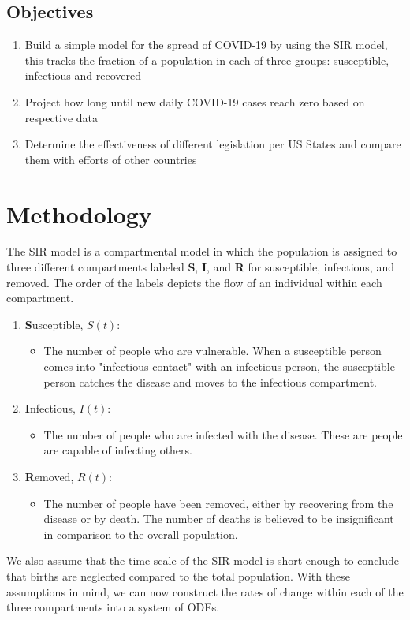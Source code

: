 \documentclass[a4paper,10pt]{article}
\begin{document}
\subsection{Objectives}

\begin{enumerate}
\item Build a simple model for the spread of COVID-19 by using the SIR model, this tracks the fraction of a population in each of three groups: susceptible, infectious and recovered \\
\item Project how long until new daily COVID-19 cases reach zero based on respective data  \\
\item Determine the effectiveness of different legislation per US States and compare them with efforts of other countries  \\
\end{enumerate}

\section{Methodology}
The SIR model is a compartmental model in which the population is assigned to three different compartments labeled \textbf{S}, \textbf{I}, and \textbf{R} for susceptible, infectious, and removed. The order of the labels depicts the flow of an individual within each compartment. 

\begin{enumerate}
   \item \textbf{S}usceptible, $S(t)$:
   \begin{itemize}
     \item The number of people who are vulnerable. When a susceptible person comes into "infectious contact" with an infectious person, the susceptible person catches the disease and moves to the infectious compartment.
   \end{itemize}
   \item \textbf{I}nfectious, $I(t)$: 
   \begin{itemize}
     \item The number of people who are infected with the disease. These are people are capable of infecting others.
   \end{itemize}
   \item \textbf{R}emoved, $R(t)$:
   \begin{itemize}
     \item The number of people have been removed, either by recovering from the disease or by death. The number of deaths is believed to be insignificant in comparison to the overall population.
   \end{itemize}
\end{enumerate}
We also assume that the time scale of the SIR model is short enough to conclude that births are neglected compared to the total population. With these assumptions in mind, we can now construct the rates of change within each of the three compartments into a system of ODEs. 
\end{document}
